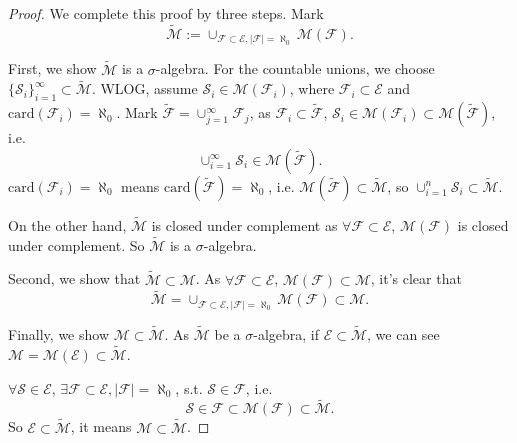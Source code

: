 \documentclass{article}
\begin{document}
\begin{proof}
    We complete this proof by three steps. Mark
    \begin{displaymath}
        \tilde{\mathcal{M}}:=     
        \cup_{\mathcal{F}\subset\mathcal{E},|\mathcal{F}|=\aleph_{0}}
        \mathcal{M}(\mathcal{F}).
    \end{displaymath}

    First, we show $\tilde{\mathcal{M}}$ 
    is a $\sigma$-algebra. 
    For the countable unions, 
    we choose 
    $\{\mathcal{S}_{i}\}_{i=1}^{\infty}\subset\tilde{\mathcal{M}}$. 
    WLOG, assume $\mathcal{S}_{i}\in\mathcal{M}(\mathcal{F}_{i})$, 
    where $\mathcal{F}_{i}\subset\mathcal{E}$ 
    and $\text{card}(\mathcal{F}_{i})=\aleph_{0}$. 
    Mark $\tilde{\mathcal{F}}=\cup_{j=1}^{\infty}\mathcal{F}_{j}$, 
    as $\mathcal{F}_{i}\subset\tilde{\mathcal{F}}$, 
    $\mathcal{S}_{i}\in\mathcal{M}(\mathcal{F}_{i})
    \subset\mathcal{M}(\tilde{\mathcal{F}})$, 
    i.e.
    \begin{displaymath}
        \cup_{i=1}^{\infty}\mathcal{S}_{i}\in\mathcal{M}
        (\tilde{\mathcal{F}}).
    \end{displaymath}
    $\text{card}(\mathcal{F}_{i})=\aleph_{0}$ means 
    $\text{card}(\tilde{\mathcal{F}})=\aleph_{0}$, 
    i.e. $\mathcal{M}(\tilde{\mathcal{F}})\subset\tilde{\mathcal{M}}$, 
    so $\cup_{i=1}^{n}\mathcal{S}_{i}\subset\tilde{\mathcal{M}}$.

    On the other hand, 
    $\tilde{\mathcal{M}}$ is closed under complement 
    as $\forall\mathcal{F}\subset\mathcal{E}$, 
    $\mathcal{M}(\mathcal{F})$ is closed under complement.
    So $\tilde{\mathcal{M}}$ is a $\sigma$-algebra.

    Second, we show that $\tilde{\mathcal{M}}\subset\mathcal{M}$. 
    As $\forall\mathcal{F}\subset\mathcal{E}$, 
    $\mathcal{M}(\mathcal{F})\subset\mathcal{M}$, 
    it's clear that 
    \begin{displaymath}
        \tilde{\mathcal{M}}=
        \cup_{\mathcal{F}\subset\mathcal{E},|\mathcal{F}|=\aleph_{0}}
        \mathcal{M}(\mathcal{F})\subset\mathcal{M}.
    \end{displaymath}

    Finally, we show $\mathcal{M}\subset\tilde{\mathcal{M}}$. 
    As $\tilde{\mathcal{M}}$ be a $\sigma$-algebra, 
    if $\mathcal{E}\subset\tilde{\mathcal{M}}$, 
    we can see $\mathcal{M}=\mathcal{M}(\mathcal{E})
    \subset\tilde{\mathcal{M}}$.

    $\forall \mathcal{S}\in\mathcal{E}$, 
    $\exists\mathcal{F}\subset\mathcal{E}, |\mathcal{F}|=\aleph_{0}$, 
    s.t. $\mathcal{S}\in\mathcal{F}$, 
    i.e.
    \begin{displaymath} 
    \mathcal{S}\in\mathcal{F}\subset
    \mathcal{M}(\mathcal{F})\subset\tilde{\mathcal{M}}.
    \end{displaymath}
    So $\mathcal{E}\subset\tilde{\mathcal{M}}$, 
    it means $\mathcal{M}\subset\tilde{\mathcal{M}}$.
\end{proof}
\end{document}
